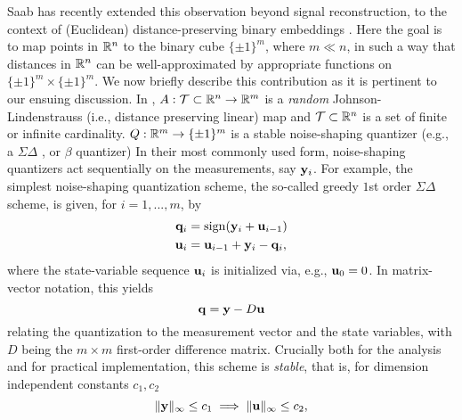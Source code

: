 Saab has recently  extended this observation beyond signal reconstruction, to the context of (Euclidean) distance-preserving binary embeddings \cite{huynh2018fast}. Here the goal is to map points in $\mathbb{R}^n$ to the binary cube $\{\pm 1\}^m$, where $m\ll n$, in such a way that  distances in $\mathbb{R}^n$ can be well-approximated by appropriate functions on $\{\pm 1\}^m \times \{\pm 1\}^m$. We now briefly describe this contribution as it is pertinent to our ensuing discussion. In \cite{huynh2018fast},  $A: \mathcal{T}\subset\mathbb{R}^n \to \mathbb{R}^m$ is a \emph{random} Johnson-Lindenstrauss \cite{johnson1984extensions} (i.e., distance preserving linear) map and  $\mathcal{T}\subset \mathbb{R}^n$ is a set of finite or infinite cardinality. $Q:\mathbb{R}^m \to \{\pm 1\}^m$ is a stable noise-shaping quantizer (e.g., a $\Sigma\Delta$ \cite{daubechies2003approximating}, or $\beta$ \cite{chou2016distributed} quantizer)
%
%
\iffalse In their most commonly used form, noise-shaping quantizers act sequentially on the measurements, say $\mathbf{y}_i$. 
For example, the simplest noise-shaping quantization scheme, the so-called greedy $1$st order $\Sigma\Delta$ scheme, is given, for $i=1,...,m$, by 
\begin{align}
    \mathbf{q}_i &= \mathrm{sign}(\mathbf{y}_i+\mathbf{u}_{i-1})\\
    \mathbf{u}_i &= \mathbf{u}_{i-1} + \mathbf{y}_i -\mathbf{q}_i,
\end{align}
where the state-variable sequence $\mathbf{u}_i$ is initialized via, e.g., $\mathbf{u}_0=0$. In matrix-vector notation, this yields  \begin{equation}\mathbf{q}=\mathbf{y} - D\mathbf{u}\label{eq:SD_state}\end{equation}  relating the quantization to the measurement vector and the state variables, with $D$ being the $m\times m$ first-order difference matrix. Crucially both for the analysis and for practical implementation, this scheme is \emph{stable}, that is, for dimension independent constants $c_1,c_2$
 \begin{equation}\|\mathbf{y}\|_\infty \leq c_1 \implies \|\mathbf{u}\|_\infty \leq c_2,\label{eq:stability}\end{equation}


